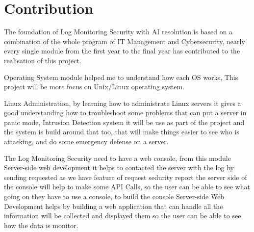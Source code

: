 
\section{Contribution}







The foundation of Log Monitoring Security with AI resolution is based on a combination of the whole program of IT Management and Cybersecurity, nearly every single module from the first year to the final year has contributed to the realisation of this project. 


Operating System module helped me to understand how each OS works, This project will be more focus on Unix/Linux operating system\cite{zeng2016computer}. 

Linux Administration, by learning how to administrate Linux servers it gives a good understanding how to troubleshoot some problems that can put a server in panic mode, Intrusion Detection system it will be use as part of the project and the system is build around that too, that will make things easier to see who is attacking, and do some emergency defense on a server\cite{8474119}. 

The Log Monitoring Security need to have a web console, from this module Server-side web development it helps to contacted the server with the log by sending requested as we have feature of request sedurity report the server side of the console will help to make some API Calls, so  the user can be able to see what going on they have to use a console, to build the console Server-side Web Development helps by building a web application that can handle all the information will be collected and displayed them so the user can be able to see how the data is monitor.

